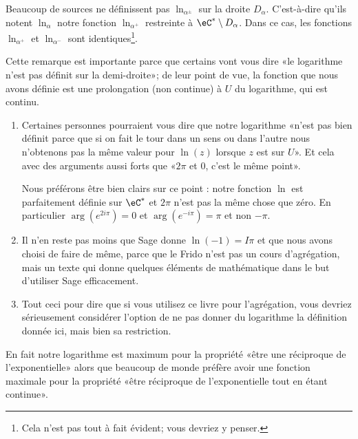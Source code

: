 \begin{remark}      \label{REMooFBLLooDnkmjR}
    Beaucoup de sources\cite{ooGUROooApafph} ne définissent pas \( \ln_{\alpha^{\pm}}\) sur la droite \( D_{\alpha}\). C'est-à-dire qu'ils notent \( \ln_{\alpha}\) notre fonction \( \ln_{\alpha^+}\) restreinte à \( \eC^*\setminus D_{\alpha}\). Dans ce cas, les fonctions \( \ln_{\alpha^+}\) et \( \ln_{\alpha^-}\) sont identiques\footnote{Cela n'est pas tout à fait évident; vous devriez y penser.}.

    Cette remarque est importante parce que certains vont vous dire «le logarithme n'est pas définit sur la demi-droite»; de leur point de vue, la fonction que nous avons définie est une prolongation (non continue) à \( U\) du logarithme, qui est continu.

    \begin{enumerate}
        \item
            Certaines personnes pourraient vous dire que notre logarithme «n'est pas bien définit parce que si on fait le tour dans un sens ou dans l'autre nous n'obtenons pas la même valeur pour \( \ln(z)\) lorsque \( z\) est sur \( U\)». Et cela avec des arguments aussi forts que «\( 2\pi\) et \( 0\), c'est le même point».

            Nous préférons être bien clairs sur ce point : notre fonction \( \ln\) est parfaitement définie sur \( \eC^*\) et \( 2\pi\) n'est pas la même chose que zéro. En particulier \( \arg( e^{2i\pi})=0\) et \(  \arg(e^{-i\pi})=\pi\) et non \( -\pi\).
        \item
            Il n'en reste pas moins que Sage donne \( \ln(-1)=I\pi\) et que nous avons choisi de faire de même, parce que le Frido n'est pas un cours d'agrégation, mais un texte qui donne quelques éléments de mathématique dans le but d'utiliser Sage efficacement.
        \item
            Tout ceci pour dire que si vous utilisez ce livre pour l'agrégation, vous devriez sérieusement considérer l'option de ne pas donner du logarithme la définition donnée ici, mais bien sa restriction.
    \end{enumerate}

    En fait notre logarithme est maximum pour la propriété «être une réciproque de l'exponentielle» alors que beaucoup de monde préfère avoir une fonction maximale pour la propriété «être réciproque de l'exponentielle tout en étant continue».

\end{remark}

